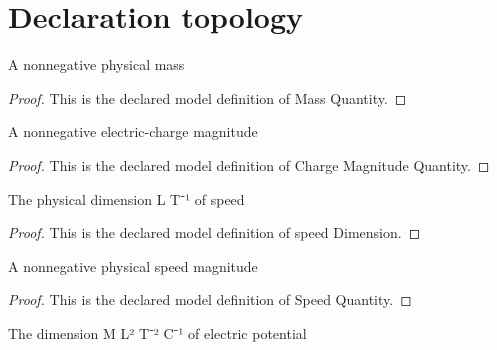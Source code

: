 \section{Declaration topology}
\begin{definition}
  \label{def:physics:phyx-mini-0866:phyxminiproblems-problemphyxmini0866-massquantity}
  A nonnegative physical mass
\end{definition}
\begin{proof}
  This is the declared model definition of Mass Quantity.
\end{proof}
\begin{definition}
  \label{def:physics:phyx-mini-0866:phyxminiproblems-problemphyxmini0866-chargemagnitudequantity}
  A nonnegative electric-charge magnitude
\end{definition}
\begin{proof}
  This is the declared model definition of Charge Magnitude Quantity.
\end{proof}
\begin{definition}
  \label{def:physics:phyx-mini-0866:phyxminiproblems-problemphyxmini0866-speeddimension}
  The physical dimension L T⁻¹ of speed
\end{definition}
\begin{proof}
  This is the declared model definition of speed Dimension.
\end{proof}
\begin{definition}
  \label{def:physics:phyx-mini-0866:phyxminiproblems-problemphyxmini0866-speedquantity}
  A nonnegative physical speed magnitude
\end{definition}
\begin{proof}
  This is the declared model definition of Speed Quantity.
\end{proof}
\begin{definition}
  \label{def:physics:phyx-mini-0866:phyxminiproblems-problemphyxmini0866-electricpotentialdimension}
  The dimension M L² T⁻² C⁻¹ of electric potential
\end{definition}
